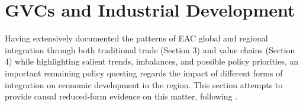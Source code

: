 \documentclass[a4paper]{article}
\begin{document}
%
%
 

\section{GVCs and Industrial Development}

Having extensively documented the patterns of EAC global and regional integration through both traditional trade (Section 3) and value chains (Section 4) while highlighting salient trends, imbalances, and possible policy priorities, an important remaining policy questing regards the impact of different forms of integration on economic development in the region. This section attempts to provide causal reduced-form evidence on this matter, following \citet{Kummritz20161}. \newline
\end{document}
